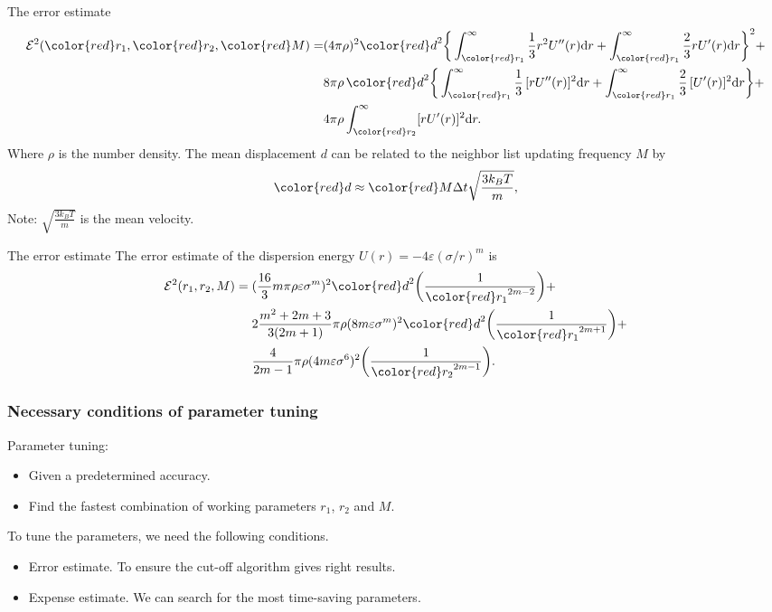 \documentclass{beamer}
\newcommand{\redc}[1]{{\color{red} #1}}
\newcommand{\bluec}[1]{{\color{blue} #1}}
\renewcommand{\d}[1]{\textrm{#1}}
\begin{document}
\begin{frame}{The error estimate}
  \bluec{
  \begin{align*}
    \mathcal E^2 (\redc{r_1}, \redc{r_2}, \redc{M})
    = &
    (4\pi\rho)^2
    \redc{d}^2 \bigg\{
    \int_{\redc{r_1}}^{\infty}\frac13r^2U''(r)\d dr + 
    \int_{\redc{r_1}}^{\infty}\frac23rU'(r)\d dr 
    \bigg\}^2 +  \\
    &
    8\pi\rho\,
    \redc{d}^2 \bigg\{
    \int_{\redc{r_1}}^\infty\frac13\,[rU''(r)]^2\d dr + 
    \int_{\redc{r_1}}^\infty\frac23\,[U'(r)]^2\d dr  
    \bigg\} + \\
    &
    4\pi\rho\int_{\redc{r_2}}^\infty [rU'(r)]^2\d dr.
  \end{align*}
  }
  Where $\rho$ is the number density.
  The mean displacement $d$ can be related to the neighbor list
  updating frequency $M$ by
  \bluec{
    \begin{align*}\label{tmpeq:7}
      \redc{d} \approx \redc{M}\Delta t\sqrt{\frac{3k_BT}m},
    \end{align*}
  }
  Note: $\sqrt{\frac{3k_BT}m}$ is the mean velocity.
\end{frame}

\begin{frame}{The error estimate}
  The error estimate of the dispersion energy \bluec{$U(r) =-
    4\varepsilon(\sigma/r)^{m}$} is \bluec{
  \begin{align*}
    \mathcal E^2 (r_1, r_2, M)
    = \;&
    (\frac{16}3m\pi\rho\varepsilon\sigma^m)^2\redc{d}^2
    \bigg(\frac1{\redc{r_1}^{2m-2}}\bigg) +\\
    &
    2\frac{m^2+2m+3}{3(2m+1)}
    \pi\rho(8m\varepsilon\sigma^m)^2 \redc{d}^2
    \bigg(\frac1{\redc{r_1}^{2m+1}}\bigg) + \\
    &
    \frac{4}{2m-1}
    \pi\rho(4m\varepsilon\sigma^6)^2
    \bigg(\frac1{{\redc{r_2}}^{2m-1}}\bigg).
  \end{align*}
  }
\end{frame}

\begin{frame}
  \frametitle{Necessary conditions of parameter tuning}
  \vfill
  Parameter tuning:
  \vfill
  \begin{itemize}
  \item Given a \redc{predetermined accuracy}.
  \vfill
  \item Find the \redc{fastest} combination of working parameters\newline
    \redc{$r_1$, $r_2$} and \redc{$M$}.
  \end{itemize}
  \vfill
  To tune the parameters, we need the following conditions.
  \vfill
  \begin{itemize}
  \item \redc{Error estimate.} \newline
    To ensure the cut-off algorithm gives right results.
  \vfill
  \item \redc{Expense estimate.} \newline
    We can search for the most time-saving parameters.
  \end{itemize}
  \vfill
  \vfill
\end{frame}
\end{document}
